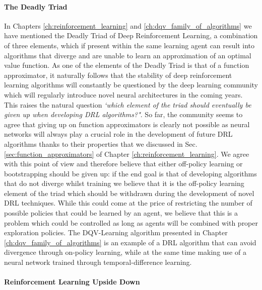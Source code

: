 \paragraph{The Deadly Triad}
In Chapters \ref{ch:reinforcement_learning} and \ref{ch:dqv_family_of_algorithms} we have mentioned the Deadly Triad of Deep Reinforcement Learning, a combination of three elements, which if present within the same learning agent can result into algorithms that diverge and are unable to learn an approximation of an optimal value function. As one of the elements of the Deadly Triad is that of a function approximator, it naturally follows that the stability of deep reinforcement learning algorithms will constantly be questioned by the deep learning community which will regularly introduce novel neural architectures in the coming years. This raises the natural question \textit{`which element of the triad should eventually be given up when developing DRL algorithms?"}. So far, the community seems to agree that giving up on function approximators is clearly not possible as neural networks will always play a crucial role in the development of future DRL algorithms \cite{van2018deep_triad,hernandez2019understanding,fedus2020revisiting} thanks to their properties that we discussed in Sec. \ref{sec:function_approximators} of Chapter \ref{ch:reinforcement_learning}. We agree with this point of view and therefore believe that either off-policy learning or bootstrapping should be given up: if the end goal is that of developing algorithms that do not diverge whilst training we believe that it is the off-policy learning element of the triad which should be withdrawn during the development of novel DRL techniques. While this could come at the price of restricting the number of possible policies that could be learned by an agent, we believe that this is a problem which could be controlled as long as agents will be combined with proper exploration policies. The DQV-Learning algorithm presented in Chapter \ref{ch:dqv_family_of_algorithms} is an example of a DRL algorithm that can avoid divergence through on-policy learning, while at the same time making use of a neural network trained through temporal-difference learning. 


\paragraph{Reinforcement Learning Upside Down}

